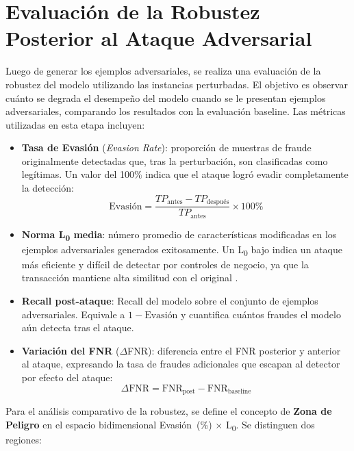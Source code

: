 \section{Evaluación de la Robustez Posterior al Ataque Adversarial}

Luego de generar los ejemplos adversariales, se realiza una evaluación de la robustez del modelo utilizando las instancias perturbadas. El objetivo es observar cuánto se degrada el desempeño del modelo cuando se le presentan ejemplos adversariales, comparando los resultados con la evaluación baseline. Las métricas utilizadas en esta etapa incluyen:

\begin{itemize}
    \item \textbf{Tasa de Evasión} (\textit{Evasion Rate}): proporción de muestras de fraude originalmente detectadas que, tras la perturbación, son clasificadas como legítimas. Un valor del 100\% indica que el ataque logró evadir completamente la detección:
    \[
    \mathrm{Evasión} = \frac{TP_{\text{antes}} - TP_{\text{después}}}{TP_{\text{antes}}} \times 100\%
    \]

    \item \textbf{Norma L\textsubscript{0} media}: número promedio de características modificadas en los ejemplos adversariales generados exitosamente. Un L\textsubscript{0} bajo indica un ataque más eficiente y difícil de detectar por controles de negocio, ya que la transacción mantiene alta similitud con el original \cite{cartella2021adversarial}.

    \item \textbf{Recall post-ataque}: Recall del modelo sobre el conjunto de ejemplos adversariales. Equivale a $1 - \mathrm{Evasión}$ y cuantifica cuántos fraudes el modelo aún detecta tras el ataque.

    \item \textbf{Variación del FNR} ($\Delta$FNR): diferencia entre el FNR posterior y anterior al ataque, expresando la tasa de fraudes adicionales que escapan al detector por efecto del ataque:
    \[
    \Delta\mathrm{FNR} = \mathrm{FNR}_{\text{post}} - \mathrm{FNR}_{\text{baseline}}
    \]
\end{itemize}

Para el análisis comparativo de la robustez, se define el concepto de \textbf{Zona de Peligro} en el espacio bidimensional Evasión~(\%) $\times$ L\textsubscript{0}. Se distinguen dos regiones:

